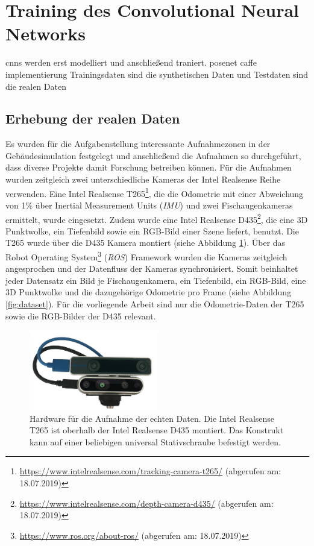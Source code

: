 \newpage
\section{Training des Convolutional Neural Networks}
cnns werden erst modelliert und anschließend traniert.
posenet caffe implementierung
Trainingsdaten sind die synthetischen Daten und Testdaten sind die realen Daten

\subsection{Erhebung der realen Daten}
Es wurden für die Aufgabenstellung interessante Aufnahmezonen in der Gebäudesimulation festgelegt und anschließend die Aufnahmen so durchgeführt, dass diverse Projekte damit Forschung betreiben können.  Für die Aufnahmen wurden zeitgleich zwei unterschiedliche Kameras der Intel Realsense Reihe verwenden. Eine Intel Realsense T265\footnote{\url{https://www.intelrealsense.com/tracking-camera-t265/} (abgerufen am: 18.07.2019)}, die die Odometrie mit einer Abweichung von 1\%  über Inertial Measurement Units (\textit{IMU}) und zwei Fischaugenkameras ermittelt, wurde eingesetzt. Zudem wurde eine Intel Realsense D435\footnote{ \url{https://www.intelrealsense.com/depth-camera-d435/} (abgerufen am: 18.07.2019)}, die eine 3D Punktwolke, ein Tiefenbild sowie ein RGB-Bild einer Szene liefert, benutzt. Die T265 wurde über die D435 Kamera montiert (siehe Abbildung \ref{fig:t265_d435}). Über das Robot Operating System\footnote{\url{https://www.ros.org/about-ros/} (abgerufen am: 18.07.2019)} (\textit{ROS}) Framework wurden die Kameras zeitgleich angesprochen und der Datenfluss der Kameras synchronisiert. Somit beinhaltet jeder Datensatz ein Bild je Fischaugenkamera, ein Tiefenbild, ein RGB-Bild, eine 3D Punktwolke und die dazugehörige Odometrie pro Frame (siehe Abbildung \ref{fig:dataset}). Für die vorliegende Arbeit sind nur die Odometrie-Daten der T265 sowie die RGB-Bilder der D435 relevant.


\begin{figure}[htp]
	\centering
	\includegraphics[width=0.5\textwidth]{images/dataset/t265_d435_2.png}
	\caption{Hardware für die Aufnahme der echten Daten. Die Intel Realsense T265 ist oberhalb der Intel Realsense D435 montiert. Das Konstrukt kann auf einer beliebigen universal Stativschraube befestigt werden.  }
	\label{fig:t265_d435}
\end{figure}


